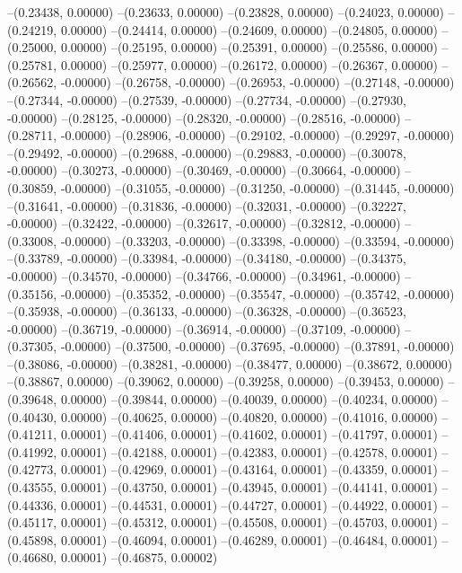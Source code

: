 --(0.23438, 0.00000)
--(0.23633, 0.00000)
--(0.23828, 0.00000)
--(0.24023, 0.00000)
--(0.24219, 0.00000)
--(0.24414, 0.00000)
--(0.24609, 0.00000)
--(0.24805, 0.00000)
--(0.25000, 0.00000)
--(0.25195, 0.00000)
--(0.25391, 0.00000)
--(0.25586, 0.00000)
--(0.25781, 0.00000)
--(0.25977, 0.00000)
--(0.26172, 0.00000)
--(0.26367, 0.00000)
--(0.26562, -0.00000)
--(0.26758, -0.00000)
--(0.26953, -0.00000)
--(0.27148, -0.00000)
--(0.27344, -0.00000)
--(0.27539, -0.00000)
--(0.27734, -0.00000)
--(0.27930, -0.00000)
--(0.28125, -0.00000)
--(0.28320, -0.00000)
--(0.28516, -0.00000)
--(0.28711, -0.00000)
--(0.28906, -0.00000)
--(0.29102, -0.00000)
--(0.29297, -0.00000)
--(0.29492, -0.00000)
--(0.29688, -0.00000)
--(0.29883, -0.00000)
--(0.30078, -0.00000)
--(0.30273, -0.00000)
--(0.30469, -0.00000)
--(0.30664, -0.00000)
--(0.30859, -0.00000)
--(0.31055, -0.00000)
--(0.31250, -0.00000)
--(0.31445, -0.00000)
--(0.31641, -0.00000)
--(0.31836, -0.00000)
--(0.32031, -0.00000)
--(0.32227, -0.00000)
--(0.32422, -0.00000)
--(0.32617, -0.00000)
--(0.32812, -0.00000)
--(0.33008, -0.00000)
--(0.33203, -0.00000)
--(0.33398, -0.00000)
--(0.33594, -0.00000)
--(0.33789, -0.00000)
--(0.33984, -0.00000)
--(0.34180, -0.00000)
--(0.34375, -0.00000)
--(0.34570, -0.00000)
--(0.34766, -0.00000)
--(0.34961, -0.00000)
--(0.35156, -0.00000)
--(0.35352, -0.00000)
--(0.35547, -0.00000)
--(0.35742, -0.00000)
--(0.35938, -0.00000)
--(0.36133, -0.00000)
--(0.36328, -0.00000)
--(0.36523, -0.00000)
--(0.36719, -0.00000)
--(0.36914, -0.00000)
--(0.37109, -0.00000)
--(0.37305, -0.00000)
--(0.37500, -0.00000)
--(0.37695, -0.00000)
--(0.37891, -0.00000)
--(0.38086, -0.00000)
--(0.38281, -0.00000)
--(0.38477, 0.00000)
--(0.38672, 0.00000)
--(0.38867, 0.00000)
--(0.39062, 0.00000)
--(0.39258, 0.00000)
--(0.39453, 0.00000)
--(0.39648, 0.00000)
--(0.39844, 0.00000)
--(0.40039, 0.00000)
--(0.40234, 0.00000)
--(0.40430, 0.00000)
--(0.40625, 0.00000)
--(0.40820, 0.00000)
--(0.41016, 0.00000)
--(0.41211, 0.00001)
--(0.41406, 0.00001)
--(0.41602, 0.00001)
--(0.41797, 0.00001)
--(0.41992, 0.00001)
--(0.42188, 0.00001)
--(0.42383, 0.00001)
--(0.42578, 0.00001)
--(0.42773, 0.00001)
--(0.42969, 0.00001)
--(0.43164, 0.00001)
--(0.43359, 0.00001)
--(0.43555, 0.00001)
--(0.43750, 0.00001)
--(0.43945, 0.00001)
--(0.44141, 0.00001)
--(0.44336, 0.00001)
--(0.44531, 0.00001)
--(0.44727, 0.00001)
--(0.44922, 0.00001)
--(0.45117, 0.00001)
--(0.45312, 0.00001)
--(0.45508, 0.00001)
--(0.45703, 0.00001)
--(0.45898, 0.00001)
--(0.46094, 0.00001)
--(0.46289, 0.00001)
--(0.46484, 0.00001)
--(0.46680, 0.00001)
--(0.46875, 0.00002)
